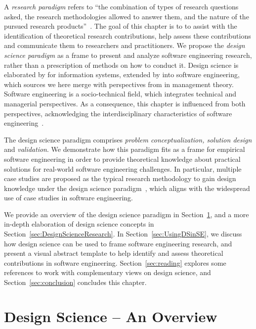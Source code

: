 \documentclass[graybox]{svmult}
\begin{document}
A \emph{research paradigm} refers to ``the combination of types of research questions asked, the research methodologies allowed to answer them, and the nature of the pursued research products''~\citep{van_aken_management_2004}. The goal of  this chapter is to  to assist with the identification of theoretical research contributions, help assess these contributions and communicate them to researchers and practitioners. 
We propose the \emph{design science paradigm} as a frame to present and analyze software engineering research, rather than a prescription of methods on how to conduct it. 
Design science is elaborated by \cite{hevner_design_2004} for information systems, extended by \cite{wieringa_what_2014} into software engineering, which sources we here merge with perspectives from \cite{van_aken_management_2004} in management theory. Software engineering is a socio-technical field, which integrates technical and managerial perspectives. As a consequence, this chapter is influenced from both perspectives, acknowledging the interdisciplinary characteristics of software engineering~\citep{Mendez2019}. 

The design science paradigm comprises \emph{problem conceptualization, solution design} and \emph{validation}. We demonstrate how this paradigm fits as a frame for empirical software engineering in order to provide theoretical knowledge about practical solutions for real-world software engineering challenges. In particular, multiple case studies are proposed as the typical research methodology to gain design knowledge under the design science paradigm~\citep{van_aken_management_2004}, which aligns with the widespread use of case studies in software engineering. 

We provide an overview of the design science paradigm in Section~\ref{sec:overview}, and a more in-depth elaboration of design science concepts in Section~\ref{sec:DesignScienceResearch}. In Section~\ref{sec:UsingDSinSE}, we discuss how design science can be used to frame software engineering research, and present a visual abstract template to help identify and assess theoretical contributions in software engineering. Section~\ref{sec:reading} explores some references to work with complementary views on design science, and Section~\ref{sec:conclusion} concludes this chapter.


\section{Design Science -- An Overview}
\label{sec:overview}
\end{document}
